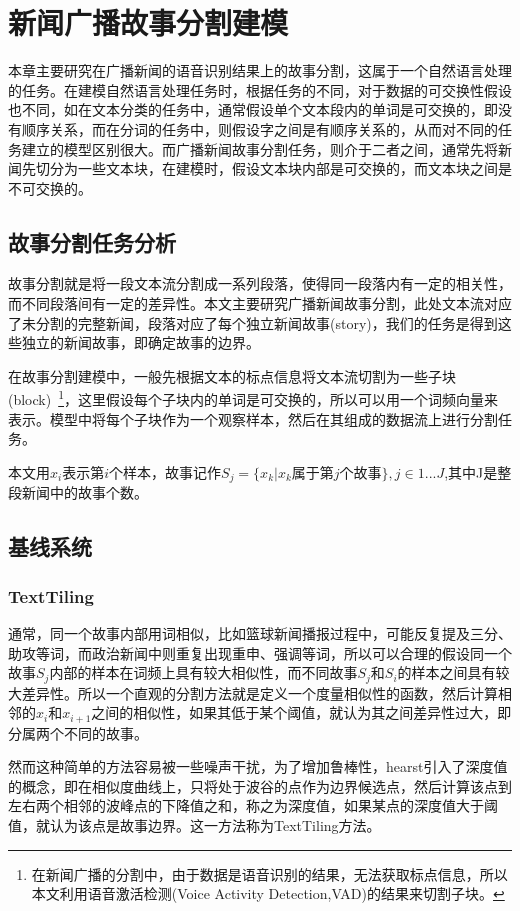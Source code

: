 \chapter{新闻广播故事分割建模}
本章主要研究在广播新闻的语音识别结果上的故事分割，这属于一个自然语言处理的任务。在建模自然语言处理任务时，根据任务的不同，对于数据的可交换性假设也不同，如在文本分类的任务中，通常假设单个文本段内的单词是可交换的，即没有顺序关系，而在分词的任务中，则假设字之间是有顺序关系的，从而对不同的任务建立的模型区别很大。而广播新闻故事分割任务，则介于二者之间，通常先将新闻先切分为一些文本块，在建模时，假设文本块内部是可交换的，而文本块之间是不可交换的。

\section{故事分割任务分析}
故事分割就是将一段文本流分割成一系列段落，使得同一段落内有一定的相关性，而不同段落间有一定的差异性。本文主要研究广播新闻故事分割，此处文本流对应了未分割的完整新闻，段落对应了每个独立新闻故事(story)，我们的任务是得到这些独立的新闻故事，即确定故事的边界。

在故事分割建模中，一般先根据文本的标点信息将文本流切割为一些子块(block)~\footnote{
在新闻广播的分割中，由于数据是语音识别的结果，无法获取标点信息，所以本文利用语音激活检测(Voice Activity Detection,VAD)的结果来切割子块。}，这里假设每个子块内的单词是可交换的，所以可以用一个词频向量来表示。模型中将每个子块作为一个观察样本，然后在其组成的数据流上进行分割任务。

本文用$x_i$表示第$i$个样本，故事记作${S}_j = \{x_k|x_k\text{属于第}j\text{个故事}\},j \in {1...J}$,其中J是整段新闻中的故事个数。

\section{基线系统}
\subsection{TextTiling}

通常，同一个故事内部用词相似，比如篮球新闻播报过程中，可能反复提及三分、助攻等词，而政治新闻中则重复出现重申、强调等词，所以可以合理的假设同一个故事$S_j$内部的样本在词频上具有较大相似性，而不同故事$S_j$和$S_i$的样本之间具有较大差异性。所以一个直观的分割方法就是定义一个度量相似性的函数，然后计算相邻的$x_i$和$x_{i+1}$之间的相似性，如果其低于某个阈值，就认为其之间差异性过大，即分属两个不同的故事。

然而这种简单的方法容易被一些噪声干扰，为了增加鲁棒性，hearst引入了深度值的概念，即在相似度曲线上，只将处于波谷的点作为边界候选点，然后计算该点到左右两个相邻的波峰点的下降值之和，称之为深度值，如果某点的深度值大于阈值，就认为该点是故事边界。这一方法称为TextTiling方法\cite{HEA:97}。

